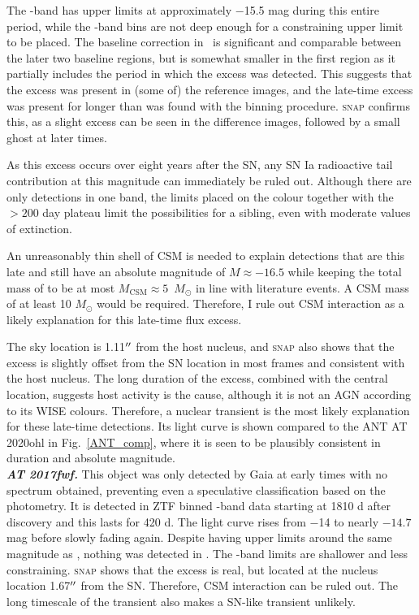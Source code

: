 \documentclass[a4paper,oneside,12pt, class=Latex/Classes/PhDthesisPSnPDF, crop=false]{standalone}
\begin{document}
The \ztfg-band has upper limits at approximately $-$15.5 mag during this entire period, while the \ztfi-band bins are not deep enough for a constraining upper limit to be placed. The baseline correction in \ztfr\ is significant and comparable between the later two baseline regions, but is somewhat smaller in the first region as it partially includes the period in which the excess was detected. This suggests that the excess was present in (some of) the reference images, and the late-time excess was present for longer than was found with the binning procedure. \textsc{snap} confirms this, as a slight excess can be seen in the difference images, followed by a small ghost at later times.

As this excess occurs over eight years after the SN, any SN Ia radioactive tail contribution at this magnitude can immediately be ruled out. Although there are only detections in one band, the limits placed on the colour together with the $>200$ day plateau limit the possibilities for a sibling, even with moderate values of extinction.

An unreasonably thin shell of CSM is needed to explain detections that are this late and still have an absolute magnitude of $M \approx -16.5$ while keeping the total mass of to be at most $M_\text{CSM} \approx 5$~$M_\odot$ in line with literature events. A CSM mass of at least 10 $M_\odot$ would be required. Therefore, I rule out CSM interaction as a likely explanation for this late-time flux excess. 

The sky location is 1.11$^{\prime\prime}$ from the host nucleus, and \textsc{snap} also shows that the excess is slightly offset from the SN location in most frames and consistent with the host nucleus. The long duration of the excess, combined with the central location, suggests host activity is the cause, although it is not an AGN according to its WISE colours. Therefore, a nuclear transient is the most likely explanation for these late-time detections. Its light curve is shown compared to the ANT AT 2020ohl in Fig.~\ref{ANT_comp}, where it is seen to be plausibly consistent in duration and absolute magnitude.\\


\textit{\textbf{AT 2017fwf.}}
This object was only detected by Gaia at early times with no spectrum obtained, preventing even a speculative classification based on the photometry. It is detected in ZTF binned \ztfr-band data starting at 1810 d after discovery and this lasts for 420 d. The light curve rises from $-$14 to nearly $-14.7$ mag before slowly fading again. Despite having upper limits around the same magnitude as \ztfr, nothing was detected in \ztfg. The \ztfi-band limits are shallower and less constraining. \textsc{snap} shows that the excess is real, but located at the nucleus location 1.67$^{\prime\prime}$ from the SN. Therefore, CSM interaction can be ruled out. The long timescale of the transient also makes a SN-like transient unlikely. 
\end{document}
